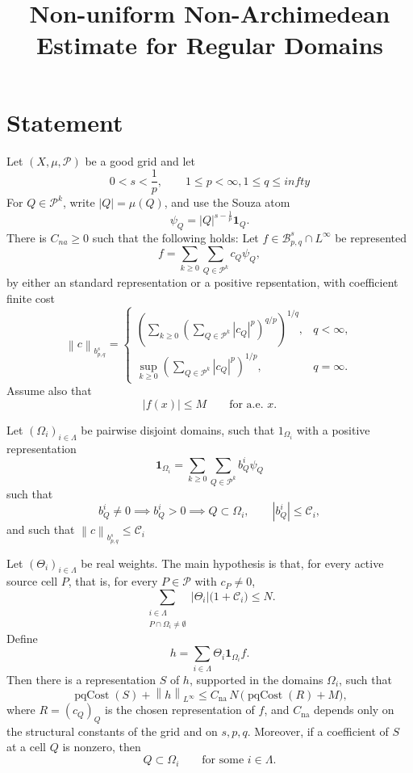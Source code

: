 \documentclass[11pt]{article}
\title{Non-uniform Non-Archimedean Estimate for Regular Domains}
\author{}
\date{}
\newcommand{\Pcal}{\mathcal P}
\newcommand{\Bcal}{\mathcal B}
\newcommand{\Ccal}{\mathcal C}
\newcommand{\Om}{\Omega}
\newcommand{\Th}{\Theta}
\newcommand{\1}{\mathbf 1}
\newcommand{\abs}[1]{\left|#1\right|}
\newcommand{\norm}[1]{\left\|#1\right\|}
\begin{document}
\maketitle

\section*{Statement}

Let \((X,\mu,\Pcal)\) be a good grid and let
\[
  0<s<\frac1p,\qquad 1\le p< \infty, 1\le q\leq  infty
\]
For \(Q\in\Pcal^k\), write \(|Q|=\mu(Q)\), and use the Souza atom
\[
  \psi_Q = |Q|^{s-\frac1p}\1_Q .
\]
There is $C_{na}\geq 0$ such that the following holds: Let \(f\in \Bcal^s_{p,q}\cap L^\infty\) be represented 
\[
  f=\sum_{k\ge0}\sum_{Q\in\Pcal^k} c_Q\psi_Q ,
\]
by either  an standard representation or a positive repsentation,
with coefficient finite  cost
\[
  \norm{c}_{b^s_{p,q}}
  =
  \begin{cases}
  \displaystyle
  \left(
    \sum_{k\ge0}
    \left(
      \sum_{Q\in\Pcal^k}\abs{c_Q}^p
    \right)^{q/p}
  \right)^{1/q},
  & q<\infty,\\[2ex]
  \displaystyle
  \sup_{k\ge0}
  \left(
    \sum_{Q\in\Pcal^k}\abs{c_Q}^p
  \right)^{1/p},
  & q=\infty.
  \end{cases}
\]
Assume also that
\[
  \abs{f(x)}\le M
  \qquad\text{for a.e. }x.
\]

Let \((\Om_i)_{i\in\Lambda}\) be pairwise disjoint domains, such that $1_{\Omega_i}$ with a positive representation 
\[
  \1_{\Om_i}
  =
  \sum_{k\ge0}\sum_{Q\in\Pcal^k} b^i_Q\psi_Q
\]
such that
\[
  b^i_Q\neq0 \implies  b^i_Q> 0\implies Q\subset \Om_i,
  \qquad
  \abs{b^i_Q}\le \Ccal_i,
\]
and such that  $\norm{c}_{b^s_{p,q}}  \leq \Ccal_i$

Let \((\Th_i)_{i\in\Lambda}\) be real weights.  The main
hypothesis is that, for every active source cell \(P\), that is, for every
\(P\in\Pcal\) with \(c_P\neq0\),
\begin{equation}\label{eq:overlap}
  \sum_{\substack{i\in\Lambda\\ P\cap\Om_i\neq\emptyset}}
  \abs{\Th_i}\bigl(1+\Ccal_i\bigr)
  \le N .
\end{equation}
Define
\[
  h
  =
  \sum_{i\in\Lambda}\Th_i\1_{\Om_i}f .
\]
Then there is a representation \(S\) of \(h\), supported in the domains
\(\Om_i\), such that
\begin{equation}\label{eq:main-bound}
  \operatorname{pqCost}(S)+\norm{h}_{L^\infty}
  \le
  C_{\mathrm{na}}\,N\,
  \bigl(\operatorname{pqCost}(R)+M\bigr),
\end{equation}
where \(R=(c_Q)_Q\) is the chosen representation of \(f\), and \(C_{\mathrm{na}}\)
depends only on the structural constants of the grid and on \(s,p,q\).
Moreover, if a coefficient of \(S\) at a cell \(Q\) is nonzero, then
\[
  Q\subset \Om_i
  \qquad\text{for some }i\in\Lambda.
\]
\end{document}
